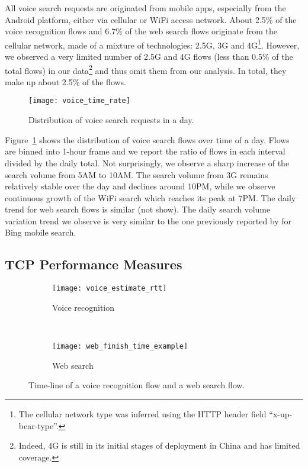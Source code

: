 All voice search requests are originated from mobile apps, especially from the Android platform, either via cellular or WiFi access network. About 2.5\% of the voice recognition flows and 6.7\% of the web search flows originate from the cellular network, made of a mixture of technologies: 2.5G, 3G and 4G\footnote{The cellular network type was inferred using the HTTP header field ``x-up-bear-type''.}. However, we observed a very limited number of 2.5G and 4G flows (less than 0.5\% of the total flows) in our data\footnote{Indeed, 4G is still in its initial stages of deployment in China and has limited coverage.} and thus omit them from our analysis. In total, they make up about 2.5\% of the flows.

\begin{figure}[th]
\centering
\texttt{[image: voice\_time\_rate]}
\caption{Distribution of voice search requests in a day.}
\label{fig:voice_time_rate}
\end{figure}

Figure~\ref{fig:voice_time_rate} shows the distribution of voice search flows over time of a day. Flows are binned into 1-hour frame and we report the ratio of flows in each interval divided by the daily total. Not surprisingly, we observe a sharp increase of the search volume from 5AM to 10AM. The search volume from 3G remains relatively stable over the day and declines around 10PM, while we observe continuous growth of the WiFi search which reaches its peak at 7PM. The daily trend for web search flows is similar (not show). The daily search volume variation trend we observe is very similar to the one previously reported by \cite{Song:2013:EEU:2488388.2488493} for Bing mobile search.

\subsection{TCP Performance Measures}

\begin{figure}[ht]
\centering
\begin{subfigure}[b]{0.6\linewidth}
	\texttt{[image: voice\_estimate\_rtt]}
\caption{Voice recognition}
\label{fig:voice_estimate_rtt}
\end{subfigure} \\
\begin{subfigure}[b]{0.6\linewidth}
	\texttt{[image: web\_finish\_time\_example]}
\caption{Web search}
\label{fig:web_finish_time_example}
\end{subfigure}
\caption{Time-line of a voice recognition flow and a web search flow.}
\label{fig:time_line}
\end{figure}

